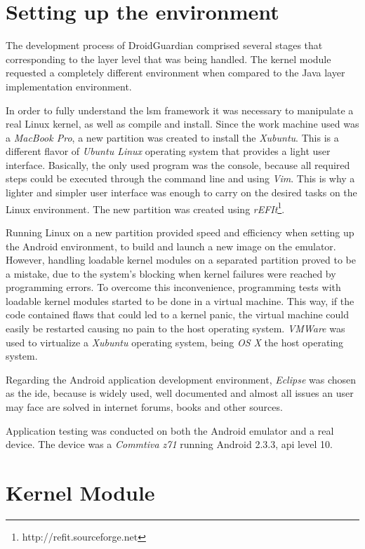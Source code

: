 


\section{Setting up the environment}

The development process of DroidGuardian comprised several stages that corresponding to the layer level that was being handled. The kernel module requested a completely different environment when compared to the Java layer implementation environment.

In order to fully understand the \gls{lsm} framework it was necessary to manipulate a real Linux kernel, as well as compile and install. Since the work machine used was a \textit{MacBook Pro}, a new partition was created to install the \textit{Xubuntu}. This is a different flavor of \textit{Ubuntu Linux} operating system that provides a light user interface. Basically, the only used program was the console, because all required steps could be executed through the command line and using \textit{Vim}. This is why a lighter and simpler user interface was enough to carry on the desired tasks on the Linux environment. The new partition was created using \textit{rEFIt}\footnote{http://refit.sourceforge.net}.

Running Linux on a new partition provided speed and efficiency when setting up the Android environment, to build and launch a new image on the emulator. However, handling loadable kernel modules on a separated partition proved to be a mistake, due to the system's blocking when kernel failures were reached by programming errors. To overcome this inconvenience, programming tests with loadable kernel modules started to be done in a virtual machine. This way, if the code contained flaws that could led to a kernel panic, the virtual machine could easily be restarted causing no pain to the host operating system. \textit{VMWare} was used to virtualize a \textit{Xubuntu} operating system, being \textit{OS X} the host operating system.

Regarding the Android application development environment, \textit{Eclipse} was chosen as the \gls{ide}, because is widely used, well documented and almost all issues an user may face are solved in internet forums, books and other sources.

Application testing was conducted on both the Android emulator and a real device. The device was a \textit{Commtiva z71} running Android 2.3.3, \gls{api} level 10.

\section{Kernel Module}

